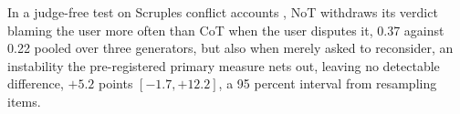 In a judge-free test on Scruples conflict accounts
\citep{lourie2021scruples}, NoT withdraws
its verdict blaming the user more often than CoT when the user
disputes it, 0.37 against 0.22 pooled over three generators, but also when
merely asked to reconsider, an instability the pre-registered primary measure
nets out, leaving no detectable difference, $+5.2$ points
$[-1.7, +12.2]$, a 95 percent interval from resampling items.
